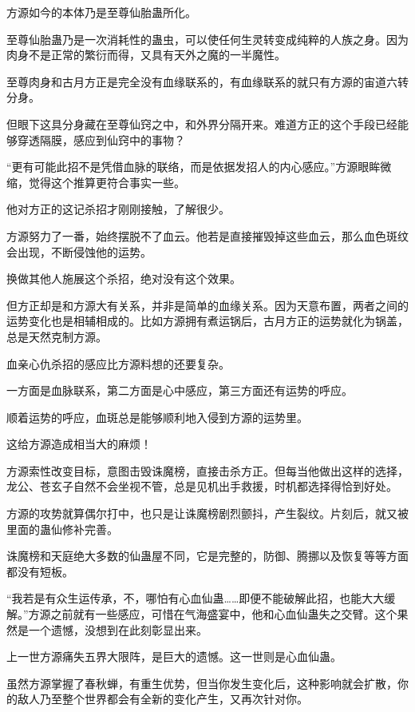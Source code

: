 
\begin{this_body}



方源如今的本体乃是至尊仙胎蛊所化。

至尊仙胎蛊乃是一次消耗性的蛊虫，可以使任何生灵转变成纯粹的人族之身。因为肉身不是正常的繁衍而得，又具有天外之魔的一半魔性。

至尊肉身和古月方正是完全没有血缘联系的，有血缘联系的就只有方源的宙道六转分身。

但眼下这具分身藏在至尊仙窍之中，和外界分隔开来。难道方正的这个手段已经能够穿透隔膜，感应到仙窍中的事物？

“更有可能此招不是凭借血脉的联络，而是依据发招人的内心感应。”方源眼眸微缩，觉得这个推算更符合事实一些。

他对方正的这记杀招才刚刚接触，了解很少。

方源努力了一番，始终摆脱不了血云。他若是直接摧毁掉这些血云，那么血色斑纹会出现，不断侵蚀他的运势。

换做其他人施展这个杀招，绝对没有这个效果。

但方正却是和方源大有关系，并非是简单的血缘关系。因为天意布置，两者之间的运势变化也是相辅相成的。比如方源拥有煮运锅后，古月方正的运势就化为锅盖，总是天然克制方源。

血亲心仇杀招的感应比方源料想的还要复杂。

一方面是血脉联系，第二方面是心中感应，第三方面还有运势的呼应。

顺着运势的呼应，血斑总是能够顺利地入侵到方源的运势里。

这给方源造成相当大的麻烦！

方源索性改变目标，意图击毁诛魔榜，直接击杀方正。但每当他做出这样的选择，龙公、苍玄子自然不会坐视不管，总是见机出手救援，时机都选择得恰到好处。

方源的攻势就算偶尔打中，也只是让诛魔榜剧烈颤抖，产生裂纹。片刻后，就又被里面的蛊仙修补完善。

诛魔榜和天庭绝大多数的仙蛊屋不同，它是完整的，防御、腾挪以及恢复等等方面都没有短板。

“我若是有众生运传承，不，哪怕有心血仙蛊……即便不能破解此招，也能大大缓解。”方源之前就有一些感应，可惜在气海盛宴中，他和心血仙蛊失之交臂。这个果然是一个遗憾，没想到在此刻彰显出来。

上一世方源痛失五界大限阵，是巨大的遗憾。这一世则是心血仙蛊。

虽然方源掌握了春秋蝉，有重生优势，但当你发生变化后，这种影响就会扩散，你的敌人乃至整个世界都会有全新的变化产生，又再次针对你。


\end{this_body}
